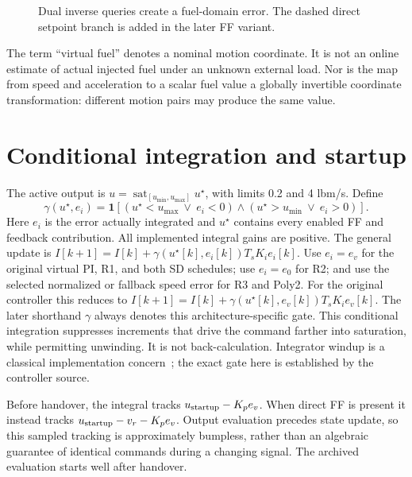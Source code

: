 \documentclass[11pt,a4paper,oneside]{report}
\newcommand{\sat}{\operatorname{sat}}
\newcommand{\blockfig}[3]{\begin{figure}[htbp]\centering\resizebox{.98\linewidth}{!}{#1}\caption{#2}\label{fig:#3}\end{figure}}
\begin{document}
\blockfig{\diagramVirtual}{Dual inverse queries create a fuel-domain error. The dashed direct setpoint branch is added in the later FF variant.}{virtual}
The term ``virtual fuel'' denotes a nominal motion coordinate. It is not an online estimate of actual injected fuel under an unknown external load. Nor is the map from speed and acceleration to a scalar fuel value a globally invertible coordinate transformation: different motion pairs may produce the same value.

\section{Conditional integration and startup}
The active output is $u=\sat_{[u_{\min},u_{\max}]}u^\star$, with limits 0.2 and 4 lbm/s. Define
\begin{equation}
\gamma(u^\star,e_i)=\mathbf1\!\left[(u^\star<u_{\max}\ \lor\ e_i<0)
\land(u^\star>u_{\min}\ \lor\ e_i>0)\right].
\end{equation}
Here $e_i$ is the error actually integrated and $u^\star$ contains every enabled FF and feedback contribution. All implemented integral gains are positive. The general update is
$I[k+1]=I[k]+\gamma(u^\star[k],e_i[k])T_sK_i e_i[k]$.
Use $e_i=e_v$ for the original virtual PI, R1, and both SD schedules; use $e_i=e_0$ for R2; and use the selected normalized or fallback speed error for R3 and Poly2. For the original controller this reduces to $I[k+1]=I[k]+\gamma(u^\star[k],e_v[k])T_sK_i e_v[k]$.
The later shorthand $\gamma$ always denotes this architecture-specific gate. This conditional integration suppresses increments that drive the command farther into saturation, while permitting unwinding. It is not back-calculation. Integrator windup is a classical implementation concern~\cite{windup}; the exact gate here is established by the controller source.

Before handover, the integral tracks $u_{\rm startup}-K_pe_v$. When direct FF is present it instead tracks $u_{\rm startup}-v_r-K_pe_v$. Output evaluation precedes state update, so this sampled tracking is approximately bumpless, rather than an algebraic guarantee of identical commands during a changing signal. The archived evaluation starts well after handover.
\end{document}

